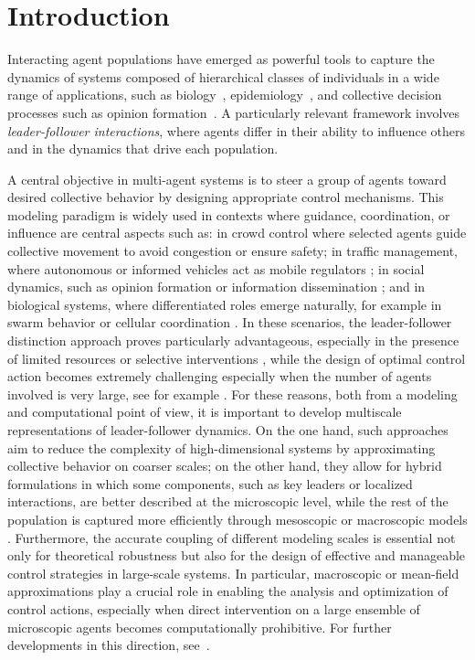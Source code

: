 \documentclass[10pt, reqno]{amsart}
\theoremstyle{definition}
\theoremstyle{remark}
\numberwithin{equation}{section}
\begin{document}
%
%
%
%
%
%
%
%
%
%
%
%
%
%
\section{Introduction}
Interacting agent populations have emerged as powerful tools to capture the dynamics of systems composed of hierarchical classes of individuals in a wide range of applications, such as biology~\cite{BTDAC97,CKFL05,Shen08}, epidemiology~\cite{AWMSAHH20,DPTZ21}, and collective decision processes such as opinion formation~\cite{APZ14,CHL12,DMPW09}. A particularly relevant framework involves \emph{leader-follower interactions}, where agents differ in their ability to influence others and in the dynamics that drive each population. 

A central objective in multi-agent systems is to steer a group of agents toward desired collective behavior by designing appropriate control mechanisms. This modeling paradigm is widely used in contexts where guidance, coordination, or influence are central aspects such as: in crowd control \cite{AB19,AFS21,BLQRS23,Bosse13,CPT14} where selected agents guide collective movement to avoid congestion or ensure safety; in traffic management, where autonomous or informed vehicles act as mobile regulators \cite{Stern18,TZ19}; in social dynamics, such as opinion formation or information dissemination \cite{APZ14,DFWZ24}; and in biological systems, where differentiated roles emerge naturally, for example in swarm behavior or cellular coordination \cite{AF24,BEP21,CLMT25,BHLY24}. In these scenarios, the leader-follower distinction approach proves particularly advantageous, especially in the presence of limited resources or selective interventions \cite{AAMS22, BFK15, CFPT13}, while the design of optimal control action becomes extremely challenging especially when the number of agents involved is very large,
see for example \cite{BBCK18, CFPT13}. For these reasons, both from a modeling and computational point of view, it is important to develop multiscale representations of leader-follower dynamics. On the one hand, such approaches aim to reduce the complexity of high-dimensional systems by approximating collective behavior on coarser scales; on the other hand, they allow for hybrid formulations in which some components, such as key leaders or localized interactions, are better described at the microscopic level, while the rest of the population is captured more efficiently through mesoscopic or macroscopic models \cite{ABCK15,CCH14,CCP17}.  Furthermore, the accurate coupling of different modeling scales is essential not only for theoretical robustness but also for the design of effective and manageable control strategies in large-scale systems. In particular, macroscopic or mean-field approximations play a crucial role in enabling the analysis and optimization of control actions, especially when direct intervention on a large ensemble of microscopic agents becomes computationally prohibitive. 
For further developments in this direction, see~\cite{AAMS22,ACFK17,BPTTR20,FPR14}.
\end{document}
